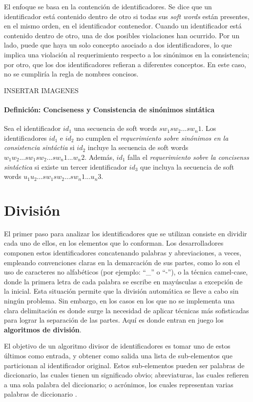 El enfoque se basa en la contención de identificadores. Se dice que un identificador está contenido dentro de otro si todas sus \textit{soft words} están presentes, en el mismo orden, en el identificador contenedor. Cuando un identificador está contenido dentro de otro, una de dos posibles violaciones han ocurrido. Por un lado, puede que haya un solo concepto asociado a dos identificadores, lo que implica una violación al requerimiento respecto a los sinónimos en la consistencia; por otro, que los dos identificadores refieran a diferentes conceptos. En este caso, no se cumpliría la regla de nombres concisos.

INSERTAR IMAGENES

\paragraph{Definición: Conciseness y Consistencia de sinónimos sintática}
Sea el identificador $id_1$ una secuencia de soft words $sw_1 sw_2 ... sw_n1$. Los identificadores $id_1$ e $id_2$ no cumplen el \textit{requerimiento sobre sinónimos en la consistencia sintáctia} si $id_2$ incluye la secuencia de soft words $w_1 w_2 ... sw_1 sw_2 ... sw_n1 ... w_n2$. Además, $id_1$ falla el \textit{requerimiento sobre la concisenss sintáctica} si existe un tercer identificador $id_3$ que incluya la secuencia de soft words $u_1 u_2 ... sw_1 sw_2 ... sw_n1 ... u_n3$.

\section{División}
El primer paso para analizar los identificadores que se utilizan consiste en dividir cada uno de ellos, en los elementos que lo conforman. Los desarrolladores componen estos identificadores concatenando palabras y abreviaciones, a veces, empleando convenciones claras en la demarcación de sus partes, como lo son el uso de caracteres no alfabéticos (por ejemplo: ``\_'' o ``-''), o la técnica camel-case, donde la primera letra de cada palabra se escribe en mayúsculas a excepción de la inicial. Esta situación permite que la división automática se lleve a cabo sin ningún problema. Sin embargo, en los casos en los que no se implementa una clara delimitación es donde surge la necesidad de aplicar técnicas más sofisticadas para lograr la separación de las partes. Aquí es donde entran en juego los \textbf{algoritmos de división}.
 
El objetivo de un algoritmo divisor de identificadores es tomar uno de estos últimos como entrada, y obtener como salida una lista de sub-elementos que particionan al identificador original. Estos sub-elementos pueden ser palabras de diccionario, las cuales tienen un significado obvio; abreviaturas, las cuales refieren a una sola palabra del diccionario; o acrónimos, los cuales representan varias palabras de diccionario \cite{HillBinkleyLawrie14}.

